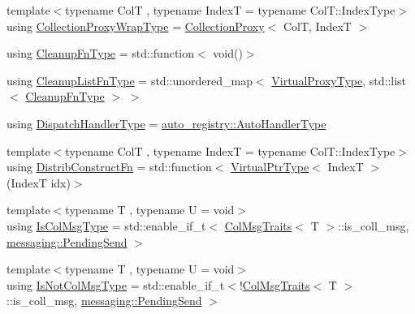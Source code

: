 \begin{DoxyCompactItemize}
\item 
{\footnotesize template$<$typename ColT , typename IndexT  = typename Col\+T\+::\+Index\+Type$>$ }\\using \hyperlink{structvt_1_1vrt_1_1collection_1_1_collection_manager_a56458ed7f9bb22b631b9b3a745f42f94}{Collection\+Proxy\+Wrap\+Type} = \hyperlink{structvt_1_1vrt_1_1collection_1_1_collection_proxy}{Collection\+Proxy}$<$ ColT, IndexT $>$
\item 
using \hyperlink{structvt_1_1vrt_1_1collection_1_1_collection_manager_a95c122e5b83bc51c306c9367b8e62c07}{Cleanup\+Fn\+Type} = std\+::function$<$ void()$>$
\item 
using \hyperlink{structvt_1_1vrt_1_1collection_1_1_collection_manager_a735e54bc5a8646536d07750e2549a156}{Cleanup\+List\+Fn\+Type} = std\+::unordered\+\_\+map$<$ \hyperlink{namespacevt_a1b417dd5d684f045bb58a0ede70045ac}{Virtual\+Proxy\+Type}, std\+::list$<$ \hyperlink{structvt_1_1vrt_1_1collection_1_1_collection_manager_a95c122e5b83bc51c306c9367b8e62c07}{Cleanup\+Fn\+Type} $>$ $>$
\item 
using \hyperlink{structvt_1_1vrt_1_1collection_1_1_collection_manager_a0cfe02a0426e95ec9daa2ef7374e07c7}{Dispatch\+Handler\+Type} = \hyperlink{namespacevt_1_1auto__registry_ae295e18699146815bb7d7674594d95d7}{auto\+\_\+registry\+::\+Auto\+Handler\+Type}
\item 
{\footnotesize template$<$typename ColT , typename IndexT  = typename Col\+T\+::\+Index\+Type$>$ }\\using \hyperlink{structvt_1_1vrt_1_1collection_1_1_collection_manager_a9ef5ab71e344fdee8525c3f18241c305}{Distrib\+Construct\+Fn} = std\+::function$<$ \hyperlink{structvt_1_1vrt_1_1collection_1_1_collection_manager_a086cab4af6af4f869fbf8814c3a9a6a4}{Virtual\+Ptr\+Type}$<$ IndexT $>$(IndexT idx)$>$
\item 
{\footnotesize template$<$typename T , typename U  = void$>$ }\\using \hyperlink{structvt_1_1vrt_1_1collection_1_1_collection_manager_a21c21612c806016788057aeab142af20}{Is\+Col\+Msg\+Type} = std\+::enable\+\_\+if\+\_\+t$<$ \hyperlink{structvt_1_1vrt_1_1collection_1_1_col_msg_traits}{Col\+Msg\+Traits}$<$ T $>$\+::is\+\_\+coll\+\_\+msg, \hyperlink{structvt_1_1messaging_1_1_pending_send}{messaging\+::\+Pending\+Send} $>$
\item 
{\footnotesize template$<$typename T , typename U  = void$>$ }\\using \hyperlink{structvt_1_1vrt_1_1collection_1_1_collection_manager_ae376deeefd4f89a0b1c93849977715d9}{Is\+Not\+Col\+Msg\+Type} = std\+::enable\+\_\+if\+\_\+t$<$!\hyperlink{structvt_1_1vrt_1_1collection_1_1_col_msg_traits}{Col\+Msg\+Traits}$<$ T $>$\+::is\+\_\+coll\+\_\+msg, \hyperlink{structvt_1_1messaging_1_1_pending_send}{messaging\+::\+Pending\+Send} $>$

\end{DoxyCompactItemize}
